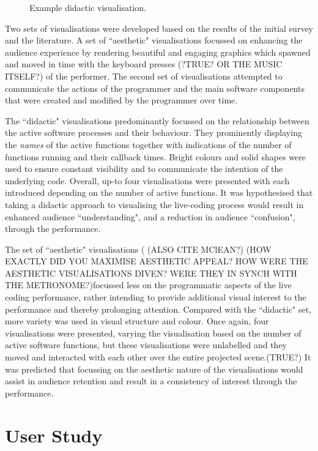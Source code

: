 \documentclass{sig-alternate}
\begin{document}
\begin{figure}
\centering
{}
\caption{Example didactic visualisation.}
\label{fig:didactic-visualisation}
\end{figure}

Two sets of visualisations were developed based on the results of the initial survey and the literature. A set of ``aesthetic" visualisations focussed on enhancing the audience experience by rendering beautiful and engaging graphics which spawned and moved in time with the keyboard presses (?TRUE? OR THE MUSIC ITSELF?) of the performer. 
The second set of visualisations attempted to communicate the actions of the programmer and the main software components that were created and modified by the programmer over time. 

The ``didactic" visualisations predominantly focussed on the relationship between the active software processes and their behaviour. They prominently displaying the {\it names} of the active functions together with indications of the number of functions running and their callback times. Bright colours and solid shapes were used to ensure constant visibility and to communicate the intention of the underlying code. Overall, up-to four visualisations were presented with each introduced depending on the number of active functions. It was hypothesised that taking a didactic approach to visualising the live-coding process would result in enhanced audience ``understanding", and a reduction in audience ``confusion", through the performance.

The set of ``aesthetic" visualisations (\cite{Cawthon2007} (ALSO CITE MClEAN?) (HOW EXACTLY DID YOU MAXIMISE AESTHETIC APPEAL? HOW WERE THE AESTHETIC VISUALISATIONS DIVEN? WERE THEY IN SYNCH WITH THE METRONOME?)focussed less on the programmatic aspects of the live coding performance, rather intending to provide additional visual interest to the performance and thereby prolonging attention. Compared with the ``didactic" set, more variety was used in visual structure and colour. Once again, four visualisations were presented, varying the visualisation based on the number of active software functions, but these visualisations were unlabelled and they moved and interacted with each other over the entire projected scene.(TRUE?) It was predicted that focussing on the aesthetic nature of the visualisations would assist in audience retention and result in a consistency of interest through the performance.

\section{User Study}
\end{document}
